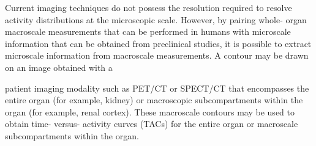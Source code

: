 \documentclass[
]{article}
\begin{document}
Current imaging techniques do not possess the resolution required to
resolve activity distributions at the microscopic scale. However, by
pairing whole- organ macroscale measurements that can be performed in
humans with microscale information that can be obtained from preclinical
studies, it is possible to extract microscale information from
macroscale measurements. A contour may be drawn on an image obtained
with a

patient imaging modality such as PET/CT or SPECT/CT that encompasses the
entire organ (for example, kidney) or macroscopic subcompartments within
the organ (for example, renal cortex). These macroscale contours may be
used to obtain time- versus- activity curves (TACs) for the entire organ
or macroscale subcompartments within the organ.
\end{document}
